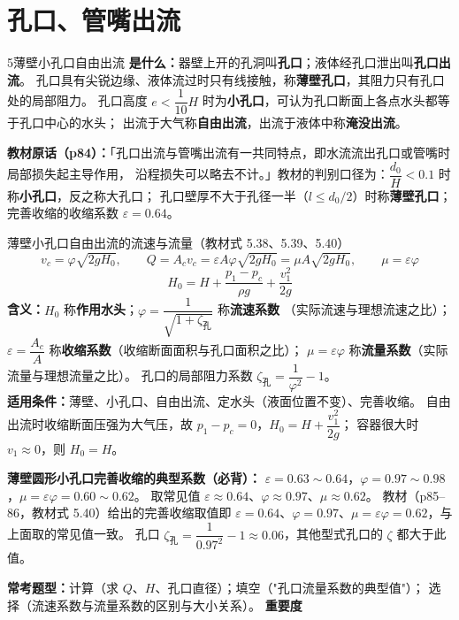 \section{孔口、管嘴出流}

\begin{kaodian}{5}{薄壁小孔口自由出流}
\textbf{是什么：}器壁上开的孔洞叫\textbf{孔口}；液体经孔口泄出叫\textbf{孔口出流}。
孔口具有尖锐边缘、液体流过时只有线接触，称\textbf{薄壁孔口}，其阻力只有孔口处的局部阻力。
孔口高度 $e<\dfrac{1}{10}H$ 时为\textbf{小孔口}，可认为孔口断面上各点水头都等于孔口中心的水头；
出流于大气称\textbf{自由出流}，出流于液体中称\textbf{淹没出流}。

\noindent\textbf{教材原话（p84）：}「孔口出流与管嘴出流有一共同特点，即水流流出孔口或管嘴时局部损失起主导作用，
沿程损失可以略去不计。」教材的判别口径为：$\dfrac{d_0}{H}<0.1$ 时称\textbf{小孔口}，反之称大孔口；
孔口壁厚不大于孔径一半（$l\le d_0/2$）时称\textbf{薄壁孔口}；完善收缩的收缩系数 $\varepsilon=0.64$。

\begin{gongshi}{薄壁小孔口自由出流的流速与流量（教材式 5.38、5.39、5.40）}
\[ v_c=\varphi\sqrt{2gH_0},\qquad Q=A_cv_c=\varepsilon A\varphi\sqrt{2gH_0}=\mu A\sqrt{2gH_0},\qquad \mu=\varepsilon\varphi \]
\[ H_0=H+\frac{p_1-p_c}{\rho g}+\frac{v_1^2}{2g} \]
\textbf{含义：}$H_0$ 称\textbf{作用水头}；$\varphi=\dfrac{1}{\sqrt{1+\zeta_{\text{孔}}}}$ 称\textbf{流速系数}
（实际流速与理想流速之比）；$\varepsilon=\dfrac{A_c}{A}$ 称\textbf{收缩系数}（收缩断面面积与孔口面积之比）；
$\mu=\varepsilon\varphi$ 称\textbf{流量系数}（实际流量与理想流量之比）。
孔口的局部阻力系数 $\zeta_{\text{孔}}=\dfrac{1}{\varphi^2}-1$。\\
\textbf{适用条件：}薄壁、小孔口、自由出流、定水头（液面位置不变）、完善收缩。
自由出流时收缩断面压强为大气压，故 $p_1-p_c=0$，$H_0=H+\dfrac{v_1^2}{2g}$；
容器很大时 $v_1\approx0$，则 $H_0=H$。
\end{gongshi}

\textbf{薄壁圆形小孔口完善收缩的典型系数（必背）：}
$\varepsilon=0.63\sim0.64$，$\varphi=0.97\sim0.98$，$\mu=\varepsilon\varphi=0.60\sim0.62$。
取常见值 $\varepsilon\approx0.64$、$\varphi\approx0.97$、$\mu\approx0.62$。
教材（p85--86，教材式 5.40）给出的完善收缩取值即 $\varepsilon=0.64$、$\varphi=0.97$、$\mu=\varepsilon\varphi=0.62$，与上面取的常见值一致。
孔口 $\zeta_{\text{孔}}=\dfrac{1}{0.97^2}-1\approx0.06$，其他型式孔口的 $\zeta$ 都大于此值。

\textbf{常考题型：}计算（求 $Q$、$H$、孔口直径）；填空（"孔口流量系数的典型值"）；
选择（流速系数与流量系数的区别与大小关系）。
\textbf{重要度 }\quad{}\quad{}


\end{kaodian}
